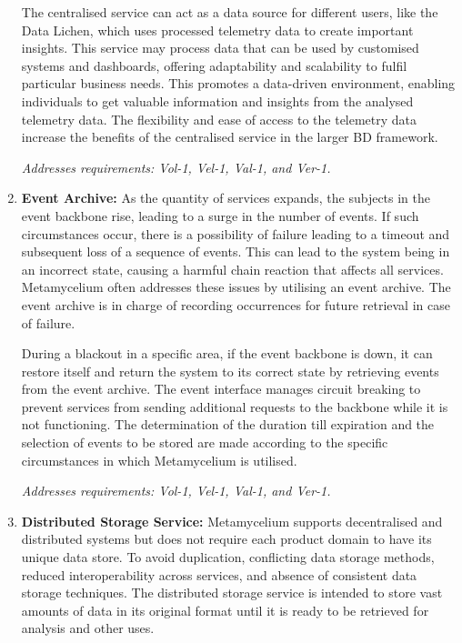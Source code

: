 \documentclass[journal]{IEEEtran}
\begin{document}
\begin{enumerate}
    The centralised service can act as a data source for different users, like the Data Lichen, which uses processed telemetry data to create important insights. This service may process data that can be used by customised systems and dashboards, offering adaptability and scalability to fulfil particular business needs. This promotes a data-driven environment, enabling individuals to get valuable information and insights from the analysed telemetry data. The flexibility and ease of access to the telemetry data increase the benefits of the centralised service in the larger BD framework.

    \textit{Addresses requirements: Vol-1, Vel-1, Val-1, and Ver-1.} 


    \item \textbf{Event Archive:} As the quantity of services expands, the subjects in the event backbone rise, leading to a surge in the number of events. If such circumstances occur, there is a possibility of failure leading to a timeout and subsequent loss of a sequence of events. This can lead to the system being in an incorrect state, causing a harmful chain reaction that affects all services. Metamycelium often addresses these issues by utilising an event archive. The event archive is in charge of recording occurrences for future retrieval in case of failure. 
    
    During a blackout in a specific area, if the event backbone is down, it can restore itself and return the system to its correct state by retrieving events from the event archive. The event interface manages circuit breaking to prevent services from sending additional requests to the backbone while it is not functioning. The determination of the duration till expiration and the selection of events to be stored are made according to the specific circumstances in which Metamycelium is utilised.


    \textit{Addresses requirements: Vol-1, Vel-1, Val-1, and Ver-1.} 

    \item \textbf{Distributed Storage Service:} Metamycelium supports decentralised and distributed systems but does not require each product domain to have its unique data store. To avoid duplication, conflicting data storage methods, reduced interoperability across services, and absence of consistent data storage techniques. The distributed storage service is intended to store vast amounts of data in its original format until it is ready to be retrieved for analysis and other uses. 
    

\end{enumerate}
\end{document}
